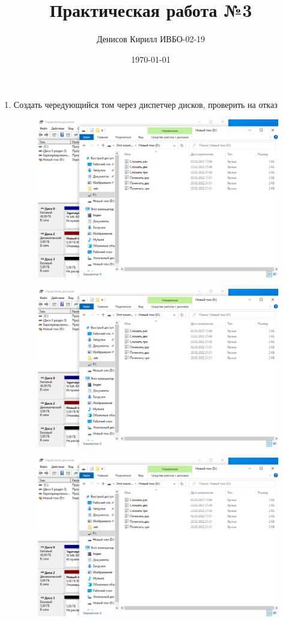 \documentclass[a4paper,14pt]{extarticle}
\author{Денисов Кирилл ИВБО-02-19}
\title{Практическая работа №3}
\date{\today}
\begin{document}
	\maketitle
	
	\begin{enumerate}
		\item Создать чередующийся том через диспетчер дисков, проверить на
		отказ
		
		\begin{figure}
			\centering
			\includegraphics[width=0.7\linewidth]{last}
			\caption{}
			\label{fig:last}
		\end{figure}
		
		\begin{figure}
			\centering
			\includegraphics[width=0.7\linewidth]{last1}
			\caption{}
			\label{fig:last1}
		\end{figure}
		\begin{figure}
			\centering
			\includegraphics[width=0.7\linewidth]{last2}
			\caption{}
			\label{fig:last2}
		\end{figure}
		

\end{enumerate}
\end{document}
